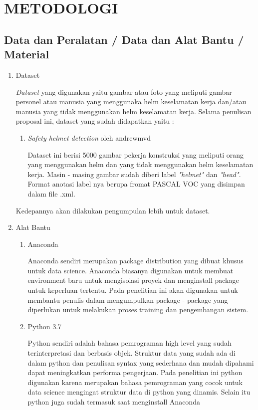 \section{METODOLOGI}
\label{chap:desainimplementasi}



\subsection{Data dan Peralatan / Data dan Alat Bantu / Material}
\label{sec:perlengkapan}


\begin{enumerate}
  \item Dataset
  \par \emph{Dataset} yang digunakan yaitu gambar atau foto yang meliputi gambar personel atau manusia yang menggunaka helm keselamatan kerja dan/atau manusia yang tidak menggunakan helm keselamatan kerja.
  Selama penulisan proposal ini, dataset yang sudah didapatkan yaitu :
  \begin{enumerate}
    \item \emph{Safety helmet detection} oleh andrewmvd
    \par Dataset ini berisi 5000 gambar pekerja konstruksi yang meliputi orang yang menggunakan helm dan yang tidak menggunakan helm keselamatan kerja. Masin - masing gambar sudah diberi label
    \emph{"helmet"} dan \emph{"head"}. Format anotasi label nya berupa fromat PASCAL VOC yang disimpan dalam file .xml.
  \end{enumerate}
  \par Kedepannya akan dilakukan pengumpulan lebih untuk dataset.

  \item Alat Bantu
  \begin{enumerate}
    \item Anaconda
    \par Anaconda sendiri merupakan package distribution yang dibuat khusus untuk data science. Anaconda biasanya digunakan untuk membuat environment baru untuk mengisolasi proyek dan menginstall package untuk keperluan tertentu. Pada penelitian ini akan digunakan untuk membantu penulis dalam mengumpulkan package - package yang diperlukan untuk melakukan proses training dan pengembangan sistem.\cite{pankajmathur_2018}

    \item Python 3.7
    \par Python sendiri adalah bahasa pemrograman high level yang sudah terinterpretasi dan berbasis objek. Struktur data yang sudah ada di dalam python dan penulisan syntax yang sederhana dan mudah dipahami dapat meningkatkan performa pengerjaan. Pada penelitian ini python digunakan karena merupakan bahasa pemrograman yang cocok untuk data science mengingat struktur data di python yang dinamis. Selain itu python juga sudah termasuk saat menginstall Anaconda \cite{python.org}


\end{enumerate}
\end{enumerate}
